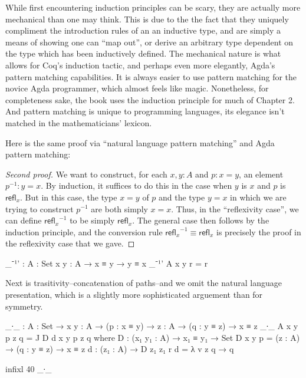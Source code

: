 \documentclass[11pt, a4paper]{article}
\newtheorem{proof}{Proof} \newtheorem{thm}{Theorem}
\newcommand{\jdeq}{\equiv} %
\newcommand{\refl}[1]{\ensuremath{\mathsf{refl}_{#1}}\xspace}
\newcommand{\opp}[1]{\mathord{{#1}^{-1}}} \let\rev\opp
\begin{document}
While first encountering induction principles can be scary, they are actually
more mechanical than one may think. This is due to the the fact that they
uniquely compliment the introduction rules of an an inductive type, and are
simply a means of showing one can ``map out'', or derive an arbitrary type
dependent on the type which has been inductively defined. The mechanical nature
is what allows for Coq's induction tactic, and perhaps even more elegantly,
Agda's pattern matching capabilities. It is always easier to use pattern
matching for the novice Agda programmer, which almost feels like magic.
Nonetheless, for completeness sake, the book uses the induction principle for
much of Chapter 2. And pattern matching is unique to programming languages, its
elegance isn't matched in the mathematicians' lexicon.

Here is the same proof via ``natural language pattern matching'' and Agda
pattern matching:

\begin{proof}[Second proof] We want to construct, for each $x,y:A$ and $p:x=y$,
an element $\opp{p}:y=x$. By induction, it suffices to do this in the case when
$y$ is $x$ and $p$ is $\refl{x}$. But in this case, the type $x=y$ of $p$ and
the type $y=x$ in which we are trying to construct $\opp{p}$ are both simply
$x=x$. Thus, in the ``reflexivity case'', we can define $\opp{\refl{x}}$ to be
simply $\refl{x}$. The general case then follows by the induction principle, and
the conversion rule $\opp{\refl{x}}\jdeq\refl{x}$ is precisely the proof in the
reflexivity case that we gave.
\end{proof}

\begin{code}

  _⁻¹' : {A : Set} {x y : A} → x ≡ y → y ≡ x _⁻¹' {A} {x} {y} r = r

\end{code}

Next is trasitivity--concatenation of paths--and we omit the natural language
presentation, which is a slightly more sophisticated arguement than for
symmetry.


\begin{code} _∙_ : {A : Set} → {x y : A} → (p : x ≡ y) → {z : A} → (q : y ≡ z) →
x ≡ z _∙_ {A} {x} {y} p {z} q = J D d x y p z q where D : (x₁ y₁ : A) → x₁ ≡ y₁
→ Set D x y p = (z : A) → (q : y ≡ z) → x ≡ z d : (z₁ : A) → D z₁ z₁ r d = λ v z
q → q

  infixl 40 _∙_
\end{code}
\end{document}
